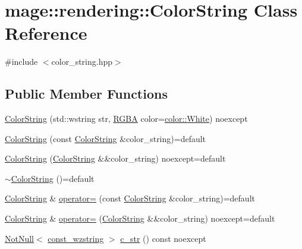 \hypertarget{classmage_1_1rendering_1_1_color_string}{}\section{mage\+:\+:rendering\+:\+:Color\+String Class Reference}
\label{classmage_1_1rendering_1_1_color_string}


{\ttfamily \#include $<$color\+\_\+string.\+hpp$>$}

\subsection*{Public Member Functions}
\begin{DoxyCompactItemize}
\item 
\mbox{\hyperlink{classmage_1_1rendering_1_1_color_string_abac2eac876023c3e4d5d4b28c0f72933}{Color\+String}} (std\+::wstring str, \mbox{\hyperlink{structmage_1_1_r_g_b_a}{R\+G\+BA}} color=\mbox{\hyperlink{namespacemage_1_1color_a39aae61faf172a41b44e2d308e1e4da6}{color\+::\+White}}) noexcept
\item 
\mbox{\hyperlink{classmage_1_1rendering_1_1_color_string_a386454b4a8e08707e8ffff8451509de5}{Color\+String}} (const \mbox{\hyperlink{classmage_1_1rendering_1_1_color_string}{Color\+String}} \&color\+\_\+string)=default
\item 
\mbox{\hyperlink{classmage_1_1rendering_1_1_color_string_a642793608186e9ac9931827ae9f0c57a}{Color\+String}} (\mbox{\hyperlink{classmage_1_1rendering_1_1_color_string}{Color\+String}} \&\&color\+\_\+string) noexcept=default
\item 
\mbox{\hyperlink{classmage_1_1rendering_1_1_color_string_a13ab2218e1cbe99241283214e455f3c9}{$\sim$\+Color\+String}} ()=default
\item 
\mbox{\hyperlink{classmage_1_1rendering_1_1_color_string}{Color\+String}} \& \mbox{\hyperlink{classmage_1_1rendering_1_1_color_string_ab42304d36628f21263a4d545831b3829}{operator=}} (const \mbox{\hyperlink{classmage_1_1rendering_1_1_color_string}{Color\+String}} \&color\+\_\+string)=default
\item 
\mbox{\hyperlink{classmage_1_1rendering_1_1_color_string}{Color\+String}} \& \mbox{\hyperlink{classmage_1_1rendering_1_1_color_string_aa70b60e0c8528306e7473ee0b5bfbe03}{operator=}} (\mbox{\hyperlink{classmage_1_1rendering_1_1_color_string}{Color\+String}} \&\&color\+\_\+string) noexcept=default
\item 
\mbox{\hyperlink{namespacemage_a8769f9d670d6b585ea306cb1062af94b}{Not\+Null}}$<$ \mbox{\hyperlink{namespacemage_ac409e0f2a22292a3a4cd42742994fbf0}{const\+\_\+wzstring}} $>$ \mbox{\hyperlink{classmage_1_1rendering_1_1_color_string_a2706724097d2ad5c187d34db49d86bda}{c\+\_\+str}} () const noexcept

\end{DoxyCompactItemize}

